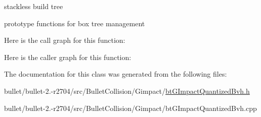 stackless build tree 

prototype functions for box tree management 

Here is the call graph for this function\+:




Here is the caller graph for this function\+:




The documentation for this class was generated from the following files\+:\begin{DoxyCompactItemize}
\item 
bullet/bullet-\/2.-\/r2704/src/\+Bullet\+Collision/\+Gimpact/\hyperlink{bt_g_impact_quantized_bvh_8h}{bt\+G\+Impact\+Quantized\+Bvh.\+h}\item 
bullet/bullet-\/2.-\/r2704/src/\+Bullet\+Collision/\+Gimpact/bt\+G\+Impact\+Quantized\+Bvh.\+cpp\end{DoxyCompactItemize}
